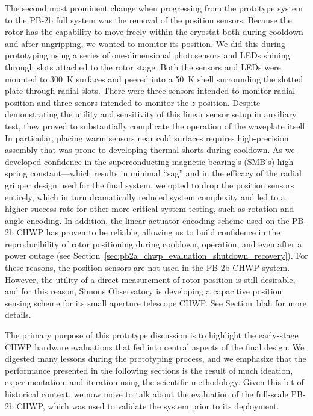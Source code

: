 The second most prominent change when progressing from the prototype system to the PB-2b full system was the removal of the position sensors. Because the rotor has the capability to move freely within the cryostat both during cooldown and after ungripping, we wanted to monitor its position. We did this during prototyping using a series of one-dimensional photosensors and LEDs shining through slots attached to the rotor stage. Both the sensors and LEDs were mounted to 300~K surfaces and peered into a 50~K shell surrounding the slotted plate through radial slots. There were three sensors intended to monitor radial position and three senors intended to monitor the $z$-position. Despite demonstrating the utility and sensitivity of this linear sensor setup in auxiliary test, they proved to substantially complicate the operation of the waveplate itself. In particular, placing warm sensors near cold surfaces requires high-precision assembly that was prone to developing thermal shorts during cooldown. As we developed confidence in the superconducting magnetic bearing's (SMB's) high spring constant---which results in minimal ``sag'' and in the efficacy of the radial gripper design used for the final system, we opted to drop the position sensors entirely, which in turn dramatically reduced system complexity and led to a higher success rate for other more critical system testing, such as rotation and angle encoding. In addition, the linear actuator encoding scheme used on the PB-2b CHWP has proven to be reliable, allowing us to build confidence in the reproducibility of rotor positioning during cooldown, operation, and even after a power outage (see Section~\ref{sec:pb2a_chwp_evaluation_shutdown_recovery}). For these reasons, the position sensors are not used in the PB-2b CHWP system. However, the utility of a direct measurement of rotor position is still desirable, and for this reason, Simons Observatory is developing a capacitive position sensing scheme for its small aperture telescope CHWP. See Section~blah for more details.

The primary purpose of this prototype discussion is to highlight the early-stage CHWP hardware evaluations that fed into central aspects of the final design. We digested many lessons during the prototyping process, and we emphasize that the performance presented in the following sections is the result of much ideation, experimentation, and iteration using the scientific methodology. Given this bit of historical context, we now move to talk about the evaluation of the full-scale PB-2b CHWP, which was used to validate the system prior to its deployment.

